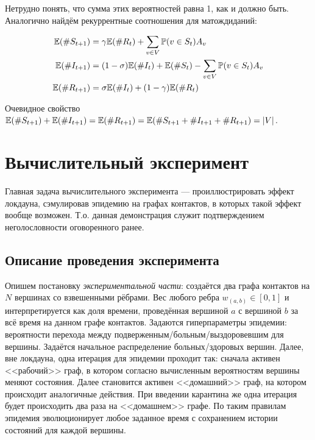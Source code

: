 	Нетрудно понять, что сумма этих вероятностей равна 1, как и должно быть. Аналогично найдём рекуррентные соотношения для матождиданий:
	
	\begin{align*}
		\mathbb{E}(\#S_{t+1}) &= \gamma \mathbb{E}(\#R_{t}) + \sum\limits_{v \in V} \mathbb{P}(v \in S_t) A_v \\
		\mathbb{E}(\#I_{t+1}) &= (1 - \sigma) \mathbb{E}(\#I_{t}) + \mathbb{E}(\#S_{t}) - \sum\limits_{v \in V} \mathbb{P}(v \in S_t) A_v \\
		\mathbb{E}(\#R_{t+1}) &=  \sigma \mathbb{E}(\# I_t) + (1 - \gamma) \mathbb{E}(\#R_{t})
	\end{align*}

	Очевидное свойство $\mathbb{E}(\#S_{t+1}) + \mathbb{E}(\#I_{t+1}) = \mathbb{E}(\#R_{t+1}) = \mathbb{E}(\#S_{t+1} + \#I_{t+1} + \#R_{t+1}) = |V|$.
	
	\section*{Вычислительный эксперимент}
	
	Главная задача вычислительного эксперимента --- проиллюстрировать эффект локдауна, сэмулировав эпидемию на графах контактов, в которых такой эффект вообще возможен. Т.о. данная демонстрация служит подтверждением неголословности оговоренного ранее.
	
	\subsection*{Описание проведения эксперимента}
	
	Опишем постановку \textit{экспериментальной части}: создаётся два графа контактов на $ N $ вершинах со взвешенными рёбрами. Вес любого ребра $ w_{(a, b)} \in [0, 1] $ и интерпретируется как доля времени, проведённая вершиной $ a $ с вершиной $ b $ за всё время на данном графе контактов. Задаются гиперпараметры эпидемии: вероятности перехода между подверженным/больным/выздоровевшим для вершины. Задаётся начальное распределение больных/здоровых вершин. Далее, вне локдауна, одна итерация для эпидемии проходит так: сначала активен <<рабочий>> граф, в котором согласно вычисленным вероятностям вершины меняют состояния. Далее становится активен <<домашний>> граф, на котором происходит аналогичные действия. При введении карантина же одна итерация будет происходить два раза на <<домашнем>> графе. По таким правилам эпидемия эволюционирует любое заданное время с сохранением истории состояний для каждой вершины.
	
